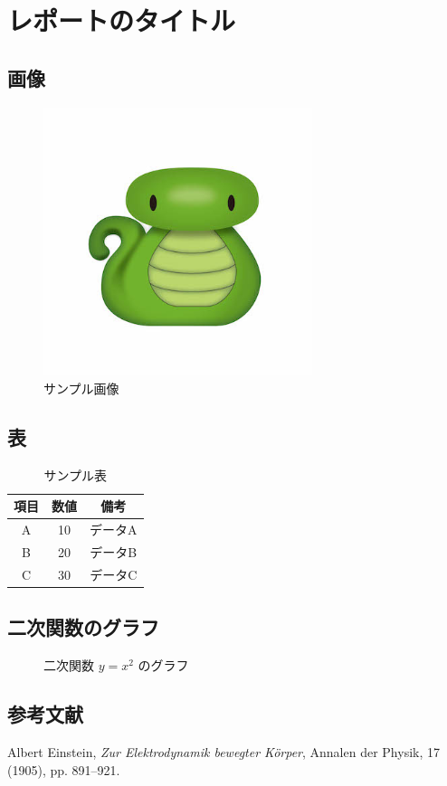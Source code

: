\documentclass{report}
\begin{document}
\chapter{レポートのタイトル}

\section{画像}
\begin{figure}[htbp]
  \centering
  \includegraphics[width=0.7\textwidth]{Its_me.jpg}
  \caption{サンプル画像}
  \label{fig:sample}
\end{figure}

\section{表}
\begin{table}[htbp]
  \centering
  \caption{サンプル表}
  \begin{tabular}{|c|c|c|}
    \hline
    項目 & 数値 & 備考   \\
    \hline
    A  & 10 & データA \\
    B  & 20 & データB \\
    C  & 30 & データC \\
    \hline
  \end{tabular}
  \label{tab:sample}
\end{table}

\section{二次関数のグラフ}
\begin{figure}[htbp]
  \centering
  \caption{二次関数 $y = x^2$ のグラフ}
  \label{fig:quadratic}
  \cite{einstein1905}
\end{figure}

\section{参考文献}
\begin{thebibliography}{9}
  Albert Einstein,
  \textit{Zur Elektrodynamik bewegter Körper},
  Annalen der Physik, 17 (1905), pp. 891–921.
\end{thebibliography}
\end{document}
